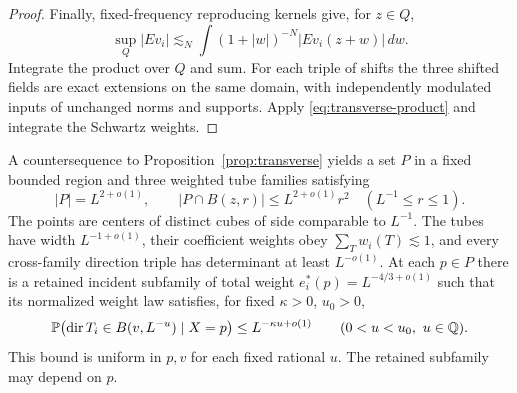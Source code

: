 \begin{proof}
Finally, fixed-frequency reproducing kernels give, for $z\in Q$,
\[
 \sup_Q|Ev_i|\lesssim_N
       \int(1+|w|)^{-N}|Ev_i(z+w)|\,dw.
\]
Integrate the product over $Q$ and sum.  For each triple of shifts the
three shifted fields are exact extensions on the same domain, with
independently modulated inputs of unchanged norms and supports.  Apply
\eqref{eq:transverse-product} and integrate the Schwartz weights.
\end{proof}

\begin{lemma}
\label{lem:transverse-tubes}
A countersequence to Proposition~\ref{prop:transverse} yields a set
$P$ in a fixed bounded region and three weighted tube families satisfying
\begin{equation}\label{eq:transverse-point-counts}
 |P|=L^{2+o(1)},\qquad
 |P\cap B(z,r)|\le L^{2+o(1)}r^2
             \quad(L^{-1}\le r\le1).
\end{equation}
The points are centers of distinct cubes of side comparable to $L^{-1}$.
The tubes have width $L^{-1+o(1)}$, their coefficient weights obey
$\sum_Tw_i(T)\lesssim1$, and every cross-family direction triple has
determinant at least $L^{-o(1)}$.  At each $p\in P$ there is a retained
incident subfamily of total weight $e_i^*(p)=L^{-4/3+o(1)}$ such that
its normalized weight law satisfies, for fixed $\kappa>0$, $u_0>0$,
\begin{equation}\label{eq:src1}
 \mathbb P\bigl(\operatorname{dir}T_i\in B(v,L^{-u})\mid X=p\bigr)
       \le L^{-\kappa u+o(1)}
       \qquad(0<u<u_0,\ u\in\mathbb Q).
\end{equation}
This bound is uniform in $p,v$ for each fixed rational $u$.
The retained subfamily may depend on $p$.
\end{lemma}

